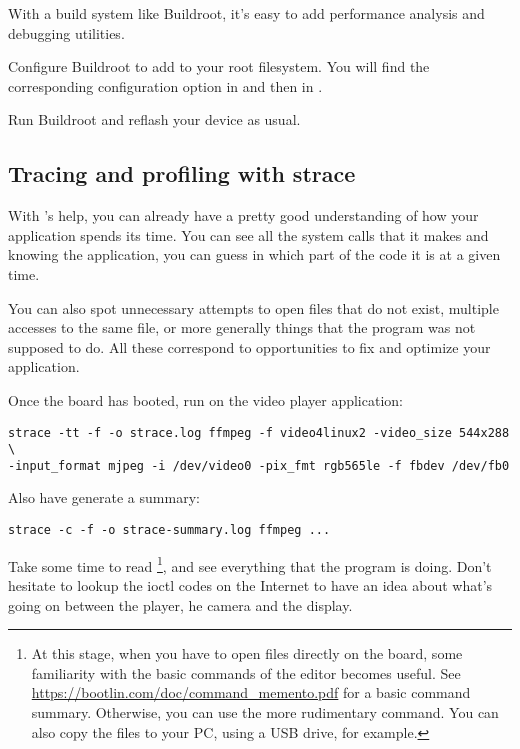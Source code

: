 With a build system like Buildroot, it's easy to add performance
analysis and debugging utilities.

Configure Buildroot to add  to your root
filesystem. You will find the corresponding configuration option in
 and then in .

Run Buildroot and reflash your device as usual.

\subsection{Tracing and profiling with strace}

With 's help, you can already have a pretty good understanding
of how your application spends its time. You can see all the system
calls that it makes and knowing the application, you can guess in which
part of the code it is at a given time.

You can also spot unnecessary attempts to open files that do not exist,
multiple accesses to the same file, or more generally things that the
program was not supposed to do. All these correspond to opportunities
to fix and optimize your application.

Once the board has booted, run  on the video player
application:

\begin{verbatim}
strace -tt -f -o strace.log ffmpeg -f video4linux2 -video_size 544x288 \
-input_format mjpeg -i /dev/video0 -pix_fmt rgb565le -f fbdev /dev/fb0
\end{verbatim}

Also have  generate a summary:

\begin{verbatim}
strace -c -f -o strace-summary.log ffmpeg ...
\end{verbatim}

Take some time to read \footnote{
At this stage, when you have to open files directly on the
board, some familiarity with the basic commands of the  editor
becomes useful. See
\url{https://bootlin.com/doc/command_memento.pdf} for a basic
command summary. Otherwise, you can use the more rudimentary 
command. You can also copy the files to your PC, using a USB drive, for
example.}, and see everything that the program is doing. Don't hesitate
to lookup the ioctl codes on the Internet to have an idea about what's
going on between the player, he camera and the display.

